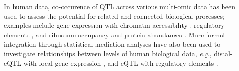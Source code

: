 \documentclass[9pt,twocolumn,twoside]{gsajnl}
\newcommand{\eg}{\emph{e.g.}\xspace}
\begin{document}
In human data, co-occurence of QTL across various multi-omic data has been used to assess the potential for related and connected biological processes; examples include gene expression with chromatin accessibility \citep{Degner2012}, regulatory elements \citep{Pai2015},  and ribosome occupancy and protein abundances \citep{Battle2015, Yang2017}.
More formal integration through statistical mediation analyses have also been used to investigate relationships between levels of human biological data, \eg, distal-eQTL with local gene expression \citep{Battle2014}, and eQTL with regulatory elements \citep{Alasoo2017, Roytman2018, Wu2018}.
\end{document}
